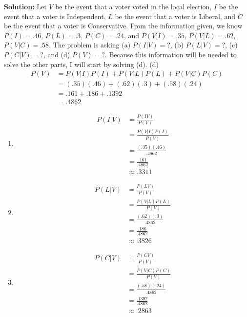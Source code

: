 \documentclass{report}
\begin{document}
\begin{enumerate}
{\bf Solution:}
Let $V$ be the event that a voter voted in the local election, $I$ be the event that a voter is Independent, $L$ be the event that a voter is Liberal, and $C$ be the event that a voter is Conservative. From the information given, we know $P(I) = .46$, $P(L) = .3$, $P(C)=.24$, and $P(V\vert I) = .35$, $ P(V\vert L) = .62$, $P(V\vert C)=.58$. The problem is asking (a) $P(I\vert V)=?$, (b) $P(L\vert V)=?$, (c)$P(C\vert V)=?$, and (d) $P(V)=?$. Because this information will be needed to solve the other parts, I will start by solving (d).\smallbreak
\setlength{\parindent}{5pt}(d)
\setlength{\parindent}{0pt}
\begin{align*}
    P(V) &= P(V\vert I)P(I)+P(V\vert L)P(L)+P(V\vert C)P(C) \\
    &= (.35)(.46)+(.62)(.3)+(.58)(.24) \\
    &= .161 + .186 + .1392 \\
    &= .4862
\end{align*}
\begin{enumerate}
    \item 
        \begin{align*}
            P(I\vert V) &= \frac{P(IV)}{P(V)} \\
            &= \frac{P(V\vert I)P(I)}{P(V)} \\
            &= \frac{(.35)(.46)}{.4862} \\
            &= \frac{.161}{.4862} \\
            &\approx .3311
        \end{align*}
    \item
        \begin{align*}
            P(L\vert V) &= \frac{P(LV)}{P(V)} \\
            &= \frac{P(V\vert L)P(L)}{P(V)} \\
            &= \frac{(.62)(.3)}{.4862} \\
            &= \frac{.186}{.4862} \\
            &\approx .3826
        \end{align*}
    \item 
        \begin{align*}
            P(C\vert V) &= \frac{P(CV)}{P(V)} \\
            &= \frac{P(V\vert C)P(C)}{P(V)} \\
            &= \frac{(.58)(.24)}{.4862} \\
            &= \frac{.1392}{.4862} \\
            &\approx .2863
        \end{align*}
\end{enumerate} 
\smallskip


\end{enumerate}
\end{document}
